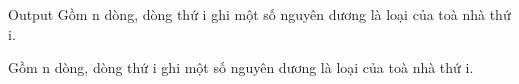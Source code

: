 Output
Gồm n dòng, dòng thứ i ghi một số nguyên dương là loại của toà nhà thứ i.

Gồm n dòng, dòng thứ i ghi một số nguyên dương là loại của toà nhà thứ i.

 